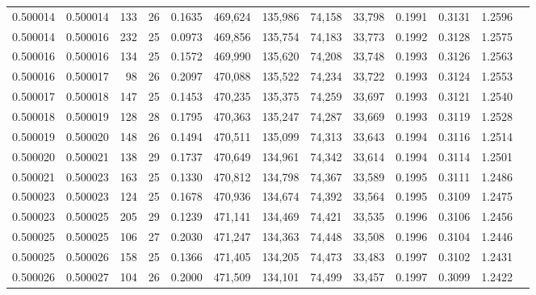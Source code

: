 \begin{tabular}{rrrrrrrrrrrrr}
0.500014 & 0.500014 & 133 &  26 &                                     0.1635 & 469,624 & 135,986 &  74,158 &  33,798 & 0.1991 & 0.3131 & 1.2596 \\
0.500014 & 0.500016 & 232 &  25 &                                     0.0973 & 469,856 & 135,754 &  74,183 &  33,773 & 0.1992 & 0.3128 & 1.2575 \\
0.500016 & 0.500016 & 134 &  25 &                                     0.1572 & 469,990 & 135,620 &  74,208 &  33,748 & 0.1993 & 0.3126 & 1.2563 \\
0.500016 & 0.500017 &  98 &  26 &                                     0.2097 & 470,088 & 135,522 &  74,234 &  33,722 & 0.1993 & 0.3124 & 1.2553 \\
0.500017 & 0.500018 & 147 &  25 &                                     0.1453 & 470,235 & 135,375 &  74,259 &  33,697 & 0.1993 & 0.3121 & 1.2540 \\
0.500018 & 0.500019 & 128 &  28 &                                     0.1795 & 470,363 & 135,247 &  74,287 &  33,669 & 0.1993 & 0.3119 & 1.2528 \\
0.500019 & 0.500020 & 148 &  26 &                                     0.1494 & 470,511 & 135,099 &  74,313 &  33,643 & 0.1994 & 0.3116 & 1.2514 \\
0.500020 & 0.500021 & 138 &  29 &                                     0.1737 & 470,649 & 134,961 &  74,342 &  33,614 & 0.1994 & 0.3114 & 1.2501 \\
0.500021 & 0.500023 & 163 &  25 &                                     0.1330 & 470,812 & 134,798 &  74,367 &  33,589 & 0.1995 & 0.3111 & 1.2486 \\
0.500023 & 0.500023 & 124 &  25 &                                     0.1678 & 470,936 & 134,674 &  74,392 &  33,564 & 0.1995 & 0.3109 & 1.2475 \\
0.500023 & 0.500025 & 205 &  29 &                                     0.1239 & 471,141 & 134,469 &  74,421 &  33,535 & 0.1996 & 0.3106 & 1.2456 \\
0.500025 & 0.500025 & 106 &  27 &                                     0.2030 & 471,247 & 134,363 &  74,448 &  33,508 & 0.1996 & 0.3104 & 1.2446 \\
0.500025 & 0.500026 & 158 &  25 &                                     0.1366 & 471,405 & 134,205 &  74,473 &  33,483 & 0.1997 & 0.3102 & 1.2431 \\
0.500026 & 0.500027 & 104 &  26 &                                     0.2000 & 471,509 & 134,101 &  74,499 &  33,457 & 0.1997 & 0.3099 & 1.2422 \\

\end{tabular}
